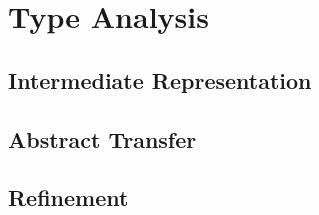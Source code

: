 \section{Type Analysis}\label{sec:analysis}

\subsection{Intermediate Representation}\label{sec:ires}

\subsection{Abstract Transfer}\label{sec:transfer}

\subsection{Refinement}\label{sec:refine}
